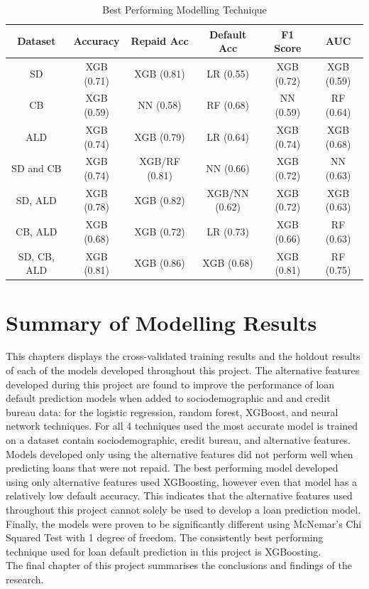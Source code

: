 \vspace{10pt}

\begin{table}[H]
\begin{center}
\begin{tabular}{|c|c|c|c|c|c|} 
\hline
\multicolumn{1}{|c|}{Dataset}
&\multicolumn{1}{|c|}{Accuracy}
&\multicolumn{1}{|c|}{Repaid Acc}
&\multicolumn{1}{|c|}{Default Acc}
&\multicolumn{1}{|c|}{F1 Score}
&\multicolumn{1}{|c|}{AUC}\\
\hline
SD & XGB (0.71) & XGB (0.81) & LR (0.55) & XGB (0.72) & XGB (0.59)    \\
\hline
CB & XGB (0.59) & NN (0.58) & RF (0.68) & NN (0.59) & RF (0.64)      \\
\hline
ALD & XGB (0.74) & XGB (0.79) & LR (0.64) & XGB (0.74) & XGB (0.68)    \\
\hline
SD and CB & XGB (0.74) & XGB/RF (0.81) & NN (0.66) & XGB (0.72) & NN (0.63)     \\
\hline
SD, ALD & XGB (0.78) & XGB (0.82) & XGB/NN (0.62) & XGB (0.72) & XGB (0.63)    \\
\hline
CB, ALD & XGB (0.68) & XGB (0.72) & LR (0.73) & XGB (0.66) & RF (0.63)    \\
\hline
SD, CB, ALD & XGB (0.81) & XGB (0.86) & XGB (0.68) & XGB (0.81) & RF (0.75)    \\
\hline
\end{tabular}
\end{center}
\caption{Best Performing Modelling Technique}
\label{table:tech_comp}
\end{table}


\newpage


\section{Summary of Modelling Results}

This chapters displays the cross-validated training results and the holdout results of each of the models developed throughout this project. The alternative features developed during this project are found to improve the performance of loan default prediction models when added to sociodemographic and and credit bureau data: for the logistic regression, random forest, XGBoost, and neural network techniques. For all 4 techniques used the most accurate model is trained on a dataset contain sociodemographic, credit bureau, and alternative features. Models developed only using the alternative features did not perform well when predicting loans that were not repaid. The best performing model developed using only alternative features used XGBoosting, however even that model has a relatively low default accuracy. This indicates that the alternative features used throughout this project cannot solely be used to develop a loan prediction model. Finally, the models were proven to be significantly different using McNemar's Chi Squared Test with 1 degree of freedom. The consistently best performing technique used for loan default prediction in this project is XGBoosting. \\

The final chapter of this project summarises the conclusions and findings of the research. 